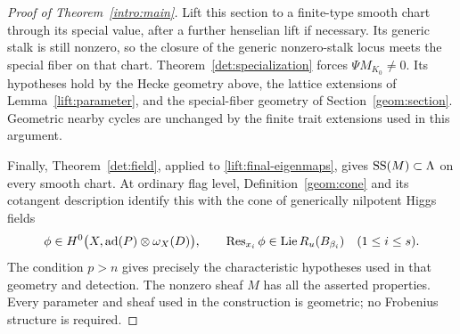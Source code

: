 \begin{proof}[Proof of Theorem~\ref{intro:main}]
Lift this section to a finite-type smooth chart through its special
value, after a further henselian lift if necessary.  Its generic
stalk is still nonzero, so the closure of the generic nonzero-stalk
locus meets the special fiber on that chart.  Theorem~\ref{det:specialization}
forces $\Psi M_{K_0}\ne0$.  Its hypotheses hold by the Hecke
geometry above, the lattice extensions of
Lemma~\ref{lift:parameter}, and the special-fiber geometry of
Section~\ref{geom:section}.  Geometric nearby cycles are unchanged
by the finite trait extensions used in this argument.

Finally, Theorem~\ref{det:field}, applied to
\eqref{lift:final-eigenmaps}, gives $\operatorname{SS}(M)\subset\Lambda$ on every
smooth chart.  At ordinary flag level,
Definition~\ref{geom:cone} and its cotangent description identify
this with the cone of generically nilpotent Higgs fields
\[
 \phi\in H^0\bigl(X,\operatorname{ad}(P)\otimes\omega_X(D)\bigr),\qquad
 \operatorname{Res}_{x_i}\phi\in\operatorname{Lie} R_u(B_{\beta_i})\quad(1\leq i\leq s).
\]
The condition $p>n$ gives precisely the characteristic hypotheses
used in that geometry and detection.  The nonzero sheaf $M$ has
all the asserted properties.  Every parameter and sheaf used in
the construction is geometric; no Frobenius structure is required.
\end{proof}
